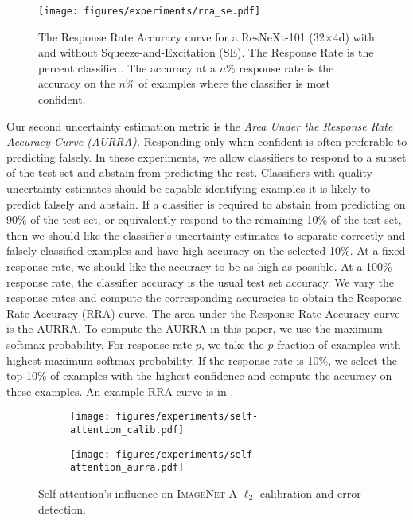 \documentclass[10pt,twocolumn,letterpaper]{article}
\begin{document}
\begin{figure}[t]
\centering
	\texttt{[image: figures/experiments/rra\_se.pdf]}
	\caption{The Response Rate Accuracy curve for a ResNeXt-101 (32$\times$4d) with and without Squeeze-and-Excitation (SE). The Response Rate is the percent classified. The accuracy at a $n$\% response rate is the accuracy on the $n$\% of examples where the classifier is most confident.
	}
	\label{fig:rra}
\end{figure}


Our second uncertainty estimation metric is the \textit{Area Under the Response Rate Accuracy Curve (AURRA).} Responding only when confident is often preferable to predicting falsely.
In these experiments, we allow classifiers to respond to a subset of the test set and abstain from predicting the rest. Classifiers with quality uncertainty estimates should be capable identifying examples it is likely to predict falsely and abstain. If a classifier is required to abstain from predicting on 90\% of the test set, or equivalently respond to the remaining 10\% of the test set, then we should like the classifier's uncertainty estimates to separate correctly and falsely classified examples and have high accuracy on the selected 10\%. At a fixed response rate, we should like the accuracy to be as high as possible. At a 100\% response rate, the classifier accuracy is the usual test set accuracy. We vary the response rates and compute the corresponding accuracies to obtain the Response Rate Accuracy (RRA) curve. The area under the Response Rate Accuracy curve is the AURRA. To compute the AURRA in this paper, we use the maximum softmax probability. For response rate $p$, we take the $p$ fraction of examples with highest maximum softmax probability. If the response rate is 10\%, we select the top 10\% of examples with the highest confidence and compute the accuracy on these examples. An example RRA curve is in  .



\begin{figure}[]
\begin{subfigure}{.48\textwidth}
    \centering
    \texttt{[image: figures/experiments/self-attention\_calib.pdf]}
\end{subfigure}
\begin{subfigure}{.48\textwidth}
    \centering
    \texttt{[image: figures/experiments/self-attention\_aurra.pdf]}
\end{subfigure}\caption{Self-attention's influence on \textsc{ImageNet-A} $\ell_2$ calibration and error detection.}\end{figure}
\end{document}
